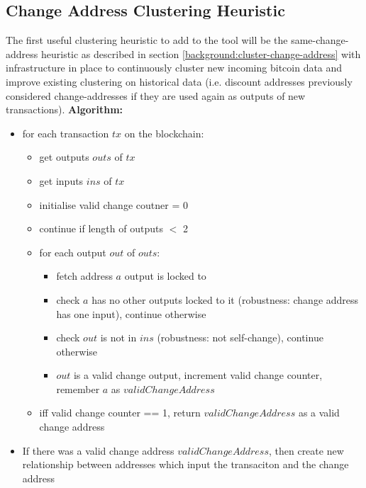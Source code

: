 \subsection{Change Address Clustering Heuristic}
The first useful clustering heuristic to add to the tool will be the same-change-address heuristic as described in section \ref{background:cluster-change-address} with infrastructure in place to continuously cluster new incoming bitcoin data and improve existing clustering on historical data (i.e. discount addresses previously considered change-addresses if they are used again as outputs of new transactions).
\textbf{Algorithm:}
\begin{itemize}
    \item for each transaction $tx$ on the blockchain:
    \begin{itemize}
        \item get outputs $outs$ of $tx$
        \item get inputs $ins$ of $tx$
        \item initialise valid change coutner = 0
        \item continue if length of outputs $<$ 2 
        \item for each output $out$ of $outs$:
        \begin{itemize}
            \item fetch address $a$ output is locked to 
            \item check $a$ has no other outputs locked to it (robustness: change address has one input), continue otherwise
            \item check $out$ is not in $ins$ (robustness: not self-change), continue otherwise
            \item $out$ is a valid change output, increment valid change counter, remember $a$ as $validChangeAddress$
        \end{itemize}
        \item iff valid change counter == 1, return $validChangeAddress$ as a valid change address
    \end{itemize}
    \item If there was a valid change address $validChangeAddress$, then create new relationship between addresses which input the transaciton and the change address
\end{itemize}

